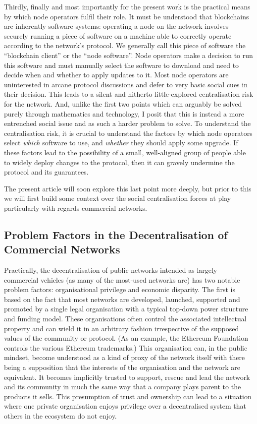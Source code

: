 \documentclass[9pt,oneside]{amsart}
\begin{document}
Thirdly, finally and most importantly for the present work is the practical means by which node operators fulfil their role. It must be understood that blockchains are inherently software systems: operating a node on the network involves securely running a piece of software on a machine able to correctly operate according to the network's protocol. We generally call this piece of software the ``blockchain client'' or the ``node software''. Node operators make a decision to run this software and must manually select the software to download and need to decide when and whether to apply updates to it. Most node operators are uninterested in arcane protocol discussions and defer to very basic social cues in their decision. This leads to a silent and hitherto little-explored centralisation risk for the network. And, unlike the first two points which can arguably be solved purely through mathematics and technology, I posit that this is instead a more entrenched social issue and as such a harder problem to solve. To understand the centralisation risk, it is crucial to understand the factors by which node operators select \emph{which} software to use, and \emph{whether} they should apply some upgrade. If these factors lead to the possibility of a small, well-aligned group of people able to widely deploy changes to the protocol, then it can gravely undermine the protocol and its guarantees.

The present article will soon explore this last point more deeply, but prior to this we will first build some context over the social centralisation forces at play particularly with regards commercial networks.

\subsection{Problem Factors in the Decentralisation of Commercial Networks}

Practically, the decentralisation of public networks intended as largely commercial vehicles (as many of the most-used networks are) has two notable problem factors: organisational privilege and economic disparity. The first is based on the fact that most networks are developed, launched, supported and promoted by a single legal organisation with a typical top-down power structure and funding model. These organisations often control the associated intellectual property and can wield it in an arbitrary fashion irrespective of the supposed values of the community or protocol. (As an example, the Ethereum Foundation controls the various Ethereum trademarks.) This organisation can, in the public mindset, become understood as a kind of proxy of the network itself with there being a supposition that the interests of the organisation and the network are equivalent. It becomes implicitly trusted to support, rescue and lead the network and its community in much the same way that a company plays parent to the products it sells. This presumption of trust and ownership can lead to a situation where one private organisation enjoys privilege over a decentralised system that others in the ecosystem do not enjoy.
\end{document}
